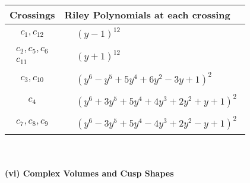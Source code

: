\documentclass[1p]{elsarticle_modified}
\theoremstyle{definition}
\begin{document}
\begin{tabular}{m{50pt}|m{274pt}}
Crossings & \hspace{64pt}Riley Polynomials at each crossing \\
\hline $$\begin{aligned}c_{1},c_{12}\end{aligned}$$&$\begin{aligned}
&(y-1)^{12}
\end{aligned}$\\
\hline $$\begin{aligned}c_{2},c_{5},c_{6}\\c_{11}\end{aligned}$$&$\begin{aligned}
&(y+1)^{12}
\end{aligned}$\\
\hline $$\begin{aligned}c_{3},c_{10}\end{aligned}$$&$\begin{aligned}
&(y^6- y^5+5 y^4+6 y^2-3 y+1)^2
\end{aligned}$\\
\hline $$\begin{aligned}c_{4}\end{aligned}$$&$\begin{aligned}
&(y^6+3 y^5+5 y^4+4 y^3+2 y^2+y+1)^2
\end{aligned}$\\
\hline $$\begin{aligned}c_{7},c_{8},c_{9}\end{aligned}$$&$\begin{aligned}
&(y^6-3 y^5+5 y^4-4 y^3+2 y^2- y+1)^2
\end{aligned}$\\
\hline
\end{tabular}\\~\\
\newpage\flushleft \textbf{(vi) Complex Volumes and Cusp Shapes}
\end{document}
